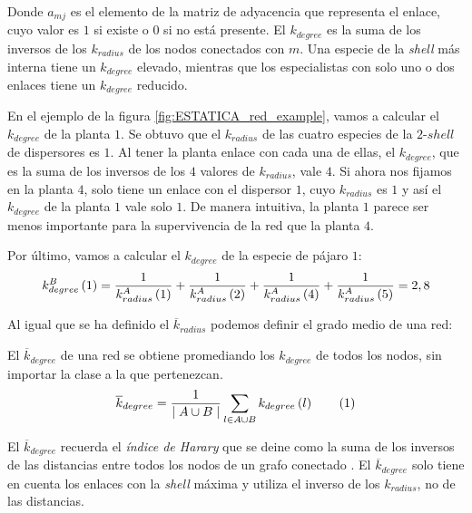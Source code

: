 Donde $a_{mj}$ es el elemento de la matriz de adyacencia que representa el enlace, cuyo valor es $1$ si existe o $0$ si no está presente. El $k_{degree}$ es la suma de los inversos de los $k_{radius}$ de los nodos conectados con $m$. Una especie de la \textit{shell} más interna tiene un $k_{degree}$ elevado,  mientras que los especialistas con solo uno o dos enlaces tiene un $k_{degree}$ reducido. 

En el ejemplo de la figura \ref{fig:ESTATICA_red_example}, vamos a calcular el $k_{degree}$ de la planta $1$. Se obtuvo que el $k_{radius}$ de las cuatro especies de la $2$-$shell$ de dispersores es $1$. Al tener la planta enlace con cada una de ellas, el $k_{degree}$, que es la suma de los inversos de los $4$ valores de $k_{radius}$, vale $4$. Si ahora nos fijamos en la planta $4$, solo tiene un enlace con el dispersor $1$, cuyo $k_{radius}$ es $1$ y así el $k_{degree}$ de la planta $1$ vale solo $1$. De manera intuitiva, la planta $1$ parece ser menos importante para la supervivencia de la red que la planta $4$. 

Por último, vamos a calcular el $k_{degree}$ de la especie de pájaro $1$:
\begin{equation}
k^B_{degree}\left(1\right) = \frac{1}{k^A_{radius}\left(1\right)} + \frac{1}{k^A_{radius}\left(2\right)} + \frac{1}{k^A_{radius}\left(4\right)} + \frac{1}{k^A_{radius}\left(5\right)} = \\
 2,8
\label{example_kdegree}
\end{equation}

Al igual que se ha definido el $\overline k_{radius}$ podemos definir el grado medio de una red:
\begin{theo} 
El \textit{$\overline k_{degree}$} de una red se obtiene promediando los ${k}_{degree}$ de todos los nodos, sin importar la clase a la que pertenezcan.
\begin{align*}
\displaystyle
\overline {k}_{degree} = \frac{1}{\mid A \cup B \mid}\sum\limits_{l \in A \cup B} k_{degree}\left(l\right)
\stepcounter{equation}\tag{\theequation}\label{avgkdegree}
\end{align*}
\label{ESTATICA_avgkdegree}
\end{theo}

El  $\overline k_{degree}$ recuerda el \textit{índice de Harary} que se deine como la suma de los inversos de las distancias entre todos los nodos de un grafo conectado \cite{plavvsic1993harary}. El  $\overline k_{degree}$ solo tiene en cuenta los enlaces con la \textit{shell} máxima y utiliza el inverso de los $k_{radius}$, no de las distancias.


